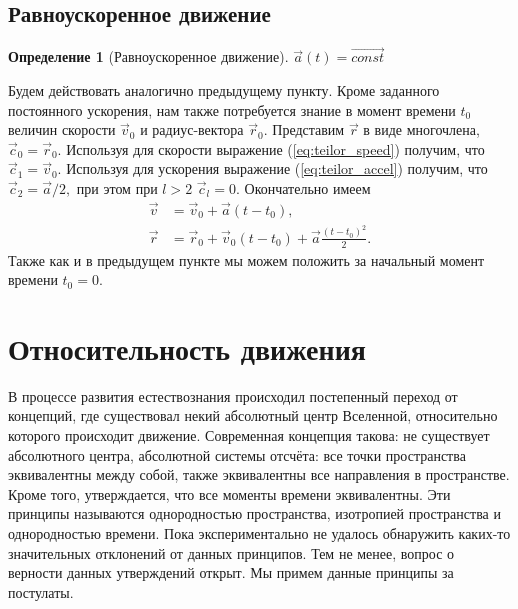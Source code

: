 \documentclass[a5paper,11pt]{article}
\newtheorem{definition}{Определение}
\begin{document}
\subsection{Равноускоренное движение}
\begin{definition}[Равноускоренное движение] $\vec{a}(t) = \overrightarrow{const}$\end{definition}
Будем действовать аналогично предыдущему пункту. Кроме заданного постоянного ускорения, нам также
потребуется знание в момент времени $t_0$ величин скорости $\vec{v}_0$ и радиус-вектора $\vec{r}_0.$
Представим $\vec{r}$ в виде многочлена, $\vec{c}_0 = \vec{r}_0.$ Используя для скорости
выражение (\ref{eq:teilor_speed}) получим, что $\vec{c}_1 = \vec{v}_0.$ Используя
для ускорения выражение (\ref{eq:teilor_accel}) получим, что
$\vec{c}_2 = \vec{a}/2,$ при этом при $l>2$ $\vec{c}_l = 0.$ Окончательно имеем
\begin{subequations}
\begin{align}
\vec{v}& = \vec{v}_0 + \vec{a} (t-t_0),\label{eq:const_accel_speed}\\
\vec{r}& = \vec{r}_0 + \vec{v}_0 (t-t_0) + \vec {a} \frac{(t-t_0)^2}{2}\label{eq:const_accel_coord}.
\end{align}
\end{subequations}
Также как и в предыдущем пункте мы можем положить за начальный момент времени
$t_0 = 0.$

\section{Относительность движения}
В процессе развития естествознания происходил постепенный переход от концепций, где
существовал некий абсолютный центр Вселенной, относительно которого происходит движение.
Современная концепция такова: не существует абсолютного центра, абсолютной системы отсчёта:
все точки пространства эквивалентны между собой, также эквивалентны все направления в пространстве.
Кроме того, утверждается, что все моменты времени эквивалентны. Эти принципы называются
однородностью пространства, изотропией пространства и однородностью времени. Пока экспериментально
не удалось обнаружить каких-то значительных отклонений от данных принципов. Тем не менее, вопрос
о верности данных утверждений открыт. Мы примем данные принципы за постулаты.
\end{document}
